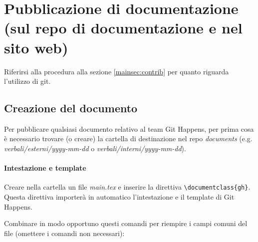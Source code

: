 
\section{Pubblicazione di documentazione (sul repo di documentazione e nel sito web)}

Riferirsi alla procedura alla sezione \ref{mainsec:contrib} per quanto riguarda l'utilizzo di git.

\newpage

\subsection{Creazione del documento}
Per pubblicare qualsiasi documento relativo al team Git Happens, per prima cosa è necessario trovare (o creare)
la cartella di destinazione nel repo \textit{documents} (e.g. \textit{verbali/esterni/yyyy-mm-dd} o \textit{verbali/interni/yyyy-mm-dd}).


\paragraph{Intestazione e template}
Creare nella cartella un file \textit{main.tex} e inserire la direttiva \texttt{\textbackslash documentclass\{gh\}}.
Questa direttiva importerà in automatico l'intestazione e il template di Git Happens.

Combinare in modo opportuno questi comandi per riempire i campi comuni del file (omettere i comandi non necessari):

